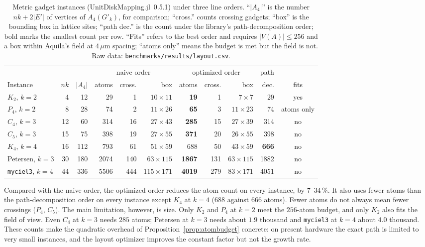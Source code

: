 \documentclass[a4paper,fleqn]{cas-sc}
\begin{document}
\begin{table}[tb]
\centering
\small
\setlength{\tabcolsep}{4pt}
\begin{tabular}{@{}lrrrrrrrrrc@{}}
\toprule
& & & \multicolumn{3}{c}{naive order} & \multicolumn{3}{c}{optimized order} & path & \\
\cmidrule(lr){4-6}\cmidrule(lr){7-9}
Instance & $nk$ & $|A_4|$ & atoms & cross. & box & atoms & cross. & box & dec. & fits \\
\midrule
$K_2$, $k{=}2$        & 4  & 12  & 29   & 1   & $10{\times}11$ & \textbf{19}   & 1   & $7{\times}7$    & 29   & yes \\
$P_4$, $k{=}2$        & 8  & 28  & 74   & 2   & $11{\times}26$ & \textbf{65}   & 3   & $11{\times}23$  & 74   & atoms only \\
$C_4$, $k{=}3$        & 12 & 60  & 314  & 16  & $27{\times}43$ & \textbf{285}  & 15  & $27{\times}39$  & 314  & no \\
$C_5$, $k{=}3$        & 15 & 75  & 398  & 19  & $27{\times}55$ & \textbf{371}  & 20  & $26{\times}55$  & 398  & no \\
$K_4$, $k{=}4$        & 16 & 112 & 793  & 61  & $51{\times}59$ & 688           & 50  & $43{\times}59$  & \textbf{666}  & no \\
Petersen, $k{=}3$     & 30 & 180 & 2074 & 140 & $63{\times}115$ & \textbf{1867} & 131 & $63{\times}115$ & 1882 & no \\
\texttt{myciel3}, $k{=}4$ & 44 & 336 & 5506 & 444 & $115{\times}171$ & \textbf{4019} & 279 & $83{\times}171$ & 4051 & no \\
\bottomrule
\end{tabular}
\caption{Metric gadget instances (UnitDiskMapping.jl~0.5.1) under three line orders.
``$|A_4|$'' is the number $nk+2|E'|$ of vertices of $A_4(G'_k)$, for comparison;
``cross.'' counts crossing gadgets; ``box'' is the bounding box in lattice sites;
``path dec.'' is the count under the library's path-decomposition order; bold marks
the smallest count per row. ``Fits'' refers to the best order and requires
$|V(A)|\le256$ and a box within Aquila's field at $4\,\mu$m spacing; ``atoms only''
means the budget is met but the field is not. Raw data:
\texttt{benchmarks/results/layout.csv}.}
\label{tab:layouteval}
\end{table}

Compared with the naive order, the optimized order reduces the atom count on every
instance, by $7$--$34\,\%$. It also uses fewer atoms than the path-decomposition order
on every instance except $K_4$ at $k=4$ ($688$ against $666$ atoms). Fewer atoms do not
always mean fewer crossings ($P_4$, $C_5$). The main limitation, however, is size.
Only $K_2$ and $P_4$ at $k=2$ meet the $256$-atom budget, and only $K_2$ also fits the
field of view. Even $C_4$ at $k=3$ needs $285$ atoms; Petersen at $k=3$ needs about
$1.9$ thousand and \texttt{myciel3} at $k=4$ about $4.0$ thousand. These counts make
the quadratic overhead of Proposition~\ref{prop:atombudget} concrete: on present
hardware the exact path is limited to very small instances, and the layout optimizer
improves the constant factor but not the growth rate.
\end{document}

